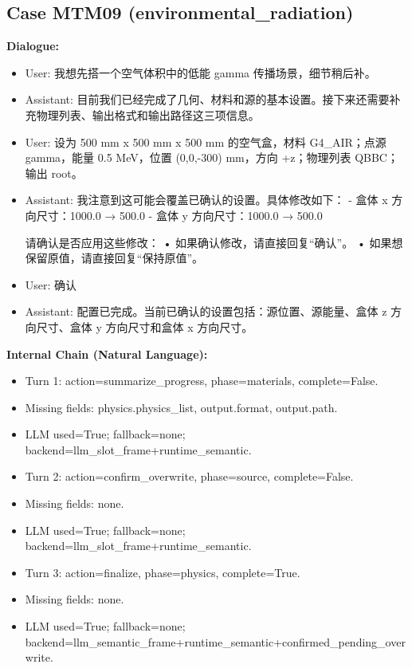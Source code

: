 \documentclass[11pt]{ctexart}
\begin{document}
\subsection{Case MTM09 (environmental\_radiation)}
\textbf{Dialogue:}
\begin{itemize}
\item User: 我想先搭一个空气体积中的低能 gamma 传播场景，细节稍后补。
\item Assistant: 目前我们已经完成了几何、材料和源的基本设置。接下来还需要补充物理列表、输出格式和输出路径这三项信息。
\item User: 设为 500 mm x 500 mm x 500 mm 的空气盒，材料 G4\_AIR；点源 gamma，能量 0.5 MeV，位置 (0,0,-300) mm，方向 +z；物理列表 QBBC；输出 root。
\item Assistant: 我注意到这可能会覆盖已确认的设置。具体修改如下：
- 盒体 x 方向尺寸：1000.0 → 500.0
- 盒体 y 方向尺寸：1000.0 → 500.0

请确认是否应用这些修改：
• 如果确认修改，请直接回复“确认”。
• 如果想保留原值，请直接回复“保持原值”。
\item User: 确认
\item Assistant: 配置已完成。当前已确认的设置包括：源位置、源能量、盒体 z 方向尺寸、盒体 y 方向尺寸和盒体 x 方向尺寸。
\end{itemize}
\textbf{Internal Chain (Natural Language):}
\begin{itemize}
\item Turn 1: action=summarize\_progress, phase=materials, complete=False.
\item Missing fields: physics.physics\_list, output.format, output.path.
\item LLM used=True; fallback=none; backend=llm\_slot\_frame+runtime\_semantic.
\item Turn 2: action=confirm\_overwrite, phase=source, complete=False.
\item Missing fields: none.
\item LLM used=True; fallback=none; backend=llm\_slot\_frame+runtime\_semantic.
\item Turn 3: action=finalize, phase=physics, complete=True.
\item Missing fields: none.
\item LLM used=True; fallback=none; backend=llm\_semantic\_frame+runtime\_semantic+confirmed\_pending\_overwrite.
\end{itemize}
\end{document}
